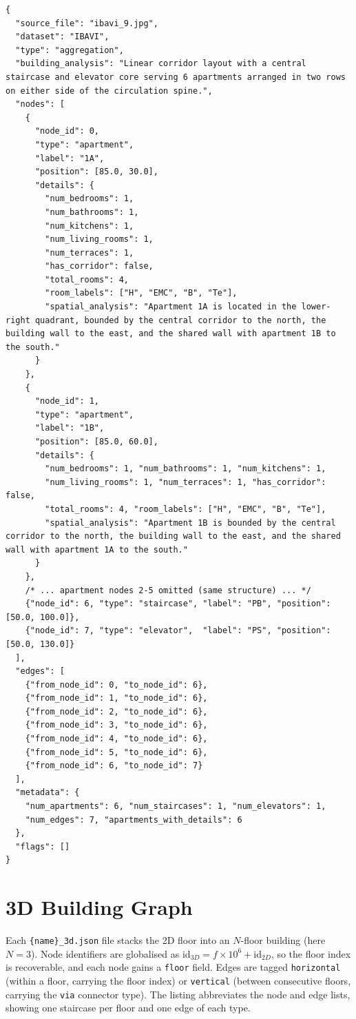 \documentclass[12pt,a4paper,openright]{report}
\newcommand{\code}[1]{\texttt{#1}}
\begin{document}
\begin{appendices}
\begin{lstlisting}[style=prompt]
{
  "source_file": "ibavi_9.jpg",
  "dataset": "IBAVI",
  "type": "aggregation",
  "building_analysis": "Linear corridor layout with a central staircase and elevator core serving 6 apartments arranged in two rows on either side of the circulation spine.",
  "nodes": [
    {
      "node_id": 0,
      "type": "apartment",
      "label": "1A",
      "position": [85.0, 30.0],
      "details": {
        "num_bedrooms": 1,
        "num_bathrooms": 1,
        "num_kitchens": 1,
        "num_living_rooms": 1,
        "num_terraces": 1,
        "has_corridor": false,
        "total_rooms": 4,
        "room_labels": ["H", "EMC", "B", "Te"],
        "spatial_analysis": "Apartment 1A is located in the lower-right quadrant, bounded by the central corridor to the north, the building wall to the east, and the shared wall with apartment 1B to the south."
      }
    },
    {
      "node_id": 1,
      "type": "apartment",
      "label": "1B",
      "position": [85.0, 60.0],
      "details": {
        "num_bedrooms": 1, "num_bathrooms": 1, "num_kitchens": 1,
        "num_living_rooms": 1, "num_terraces": 1, "has_corridor": false,
        "total_rooms": 4, "room_labels": ["H", "EMC", "B", "Te"],
        "spatial_analysis": "Apartment 1B is bounded by the central corridor to the north, the building wall to the east, and the shared wall with apartment 1A to the south."
      }
    },
    /* ... apartment nodes 2-5 omitted (same structure) ... */
    {"node_id": 6, "type": "staircase", "label": "PB", "position": [50.0, 100.0]},
    {"node_id": 7, "type": "elevator",  "label": "PS", "position": [50.0, 130.0]}
  ],
  "edges": [
    {"from_node_id": 0, "to_node_id": 6},
    {"from_node_id": 1, "to_node_id": 6},
    {"from_node_id": 2, "to_node_id": 6},
    {"from_node_id": 3, "to_node_id": 6},
    {"from_node_id": 4, "to_node_id": 6},
    {"from_node_id": 5, "to_node_id": 6},
    {"from_node_id": 6, "to_node_id": 7}
  ],
  "metadata": {
    "num_apartments": 6, "num_staircases": 1, "num_elevators": 1,
    "num_edges": 7, "apartments_with_details": 6
  },
  "flags": []
}
\end{lstlisting}

\section{3D Building Graph}
\label{appendix:json-3d}

Each \code{\{name\}\_3d.json} file stacks the 2D floor into an $N$-floor building (here $N=3$). Node identifiers are globalised as
$\mathrm{id}_{3D} = f \times 10^{6} + \mathrm{id}_{2D}$, so the floor index is recoverable, and each node gains a \code{floor} field. Edges are tagged \code{horizontal} (within a floor, carrying the floor index) or \code{vertical} (between consecutive floors, carrying the \code{via} connector type). The listing abbreviates the node and edge lists, showing one staircase per floor and one edge of each type.


\end{appendices}
\end{document}
